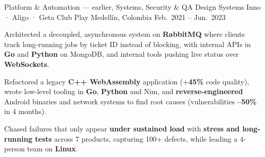 \begin{cventries}
  \cventry
  {Platform \& Automation --- earlier, Systems, Security \& QA}
  {Design Systems Inno · Aligo · Geta Club Play}
  {Medellín, Colombia}
  {Feb.\ 2021 -- Jun.\ 2023}
  {
    \begin{cvitems}
      \item {Architected a decoupled, asynchronous system on \textbf{RabbitMQ} where clients track long-running jobs by ticket ID instead of blocking, with internal APIs in \textbf{Go} and \textbf{Python} on MongoDB, and internal tools pushing live status over \textbf{WebSockets}.}
      \item {Refactored a legacy \textbf{C++ WebAssembly} application (+\textbf{45\%} code quality), wrote low-level tooling in \textbf{Go}, \textbf{Python} and Nim, and \textbf{reverse-engineered} Android binaries and network systems to find root causes (vulnerabilities \textbf{--50\%} in 4 months).}
      \item {Chased failures that only appear \textbf{under sustained load} with \textbf{stress and long-running tests} across 7 products, capturing 100+ defects, while leading a 4-person team on \textbf{Linux}.}
    \end{cvitems}
  }

\end{cventries}
